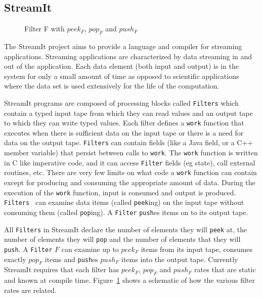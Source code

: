 \subsection{StreamIt}

\begin{figure}
\center
\epsfxsize=3.0in
\caption{Filter F with $peek_{F}$, $pop_{F}$ and $push_{F}$}
\label{fig:overview-filter}
\end{figure}


The StreamIt\cite{thies02streamit,thies01streamit,william-stream,michal-common} project
aims to provide a language and compiler for streaming applications. Streaming applications 
are characterized by data streaming in and out of the application. Each data element (both
input and output) is in the system for only a small amount of time as opposed to scientific
applications where the data set is used extensively for the life of the computation.
 
StreamIt programs are composed of processing blocks called {\tt Filters} which
contain a typed input tape from which they can read values and an output tape to which
they can write typed values. Each filter defines a {\tt work} function that executes when there
is sufficient data on the input tape or there is a need for data on the output tape.
{\tt Filters} can contain fields (like a Java field, or a C++ member variable) that
persist between calls to {\tt work}. The {\tt work} function is written in C like imperative code, 
and it can access {\tt Filter} fields (eg state), call external routines, etc.
There are very few limits on what code a {\tt work} function can contain except for
producing and consuming the appropriate amount of data.  
During the execution of the {\tt work} function, input is consumed and output is produced.
{\tt Filters } can examine data items (called {\tt peek}ing) on the input tape without
consuming them (called {\tt pop}ing). A {\tt Filter} {\tt push}es items on to its output tape.

All {\tt Filters} in StreamIt declare the number of elements they
will {\tt peek} at, the number of elements they will {\tt pop} and the number
of elements that they will {\tt push}. A {\tt Filter} $F$ can examine up to $peek_{F}$ 
items from its input tape, consumes exactly $pop_{F}$ items and {\tt push}es 
$push_{F}$ items into the output tape. Currently StreamIt requires that each filter has 
$peek_F$, $pop_F$ and $push_F$ rates that are static and known at compile time. 
Figure~\ref{fig:overview-filter} shows a schematic of how the various filter rates are related.

